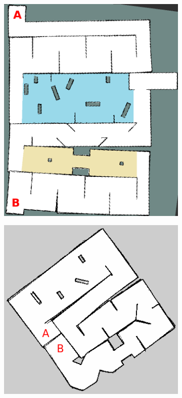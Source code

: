 \documentclass[a4paper,12pt,oneside,openright]{bhamthesis}
\begin{document}
\begin{figure}
	\centering
	\begin{subfigure}[b]{0.41\textwidth}
		\centering
		\includegraphics[width=\textwidth]{chapter4_fig/map.png}
		\caption{}
		\label{subfig:map_exp2}
	\end{subfigure}
	\hfill
	\begin{subfigure}[b]{0.45\textwidth}
		\centering
		\includegraphics[width=\textwidth]{chapter4_fig/map_real.png}

\end{subfigure}
\end{figure}
\end{document}
